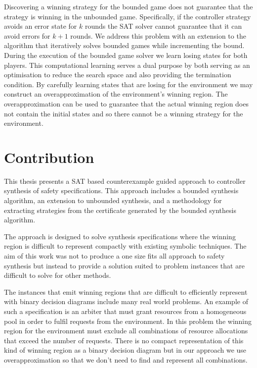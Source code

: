 Discovering a winning strategy for the bounded game does not guarantee that the strategy is winning in the unbounded game. Specifically, if the controller strategy avoids an error state for $k$ rounds the SAT solver cannot guarantee that it can avoid errors for $k+1$ rounds. We address this problem with an extension to the algorithm that iteratively solves bounded games while incrementing the bound. During the execution of the bounded game solver we learn losing states for both players. This computational learning serves a dual purpose by both serving as an optimisation to reduce the search space and also providing the termination condition. By carefully learning states that are losing for the environment we may construct an overapproximation of the environment's winning region. The overapproximation can be used to guarantee that the actual winning region does not contain the initial states and so there cannot be a winning strategy for the environment.


\section{Contribution}

This thesis presents a SAT based counterexample guided approach to controller synthesis of safety specifications. This approach includes a bounded synthesis algorithm, an extension to unbounded synthesis, and a methodology for extracting strategies from the certificate generated by the bounded synthesis algorithm. 

The approach is designed to solve synthesis specifications where the winning region is difficult to represent compactly with existing symbolic techniques. The aim of this work was not to produce a one size fits all approach to safety synthesis but instead to provide a solution suited to problem instances that are difficult to solve for other methods.

The instances that emit winning regions that are difficult to efficiently represent with binary decision diagrams include many real world problems. An example of such a specification is an arbiter that must grant resources from a homogeneous pool in order to fulfil requests from the environment. In this problem the winning region for the environment must exclude all combinations of resource allocations that exceed the number of requests. There is no compact representation of this kind of winning region as a binary decision diagram but in our approach we use overapproximation so that we don't need to find and represent all combinations.

